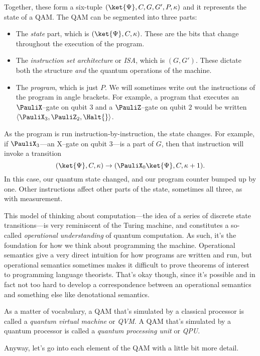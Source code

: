 Together, these form a six-tuple $(\ket{\Psi}, C, G, G', P, \kappa)$ and it represents the state of a QAM. The QAM can be segmented into three parts:
\begin{itemize}
\item The \emph{state} part, which is $(\ket{\Psi}, C, \kappa)$. These are the bits that change throughout the execution of the program.
\item The \emph{instruction set architecture} or \emph{ISA}, which is $(G, G')$. These dictate both the structure \emph{and} the quantum operations of the machine.
\item The \emph{program}, which is just $P$. We will sometimes write out the instructions of the program in angle brackets. For example, a program that executes an $\PauliX$--gate on qubit $3$ and a $\PauliZ$--gate on qubit $2$ would be written $\langle\PauliX_3,\PauliZ_2,\Halt{}\rangle$.
\end{itemize}
As the program is run instruction-by-instruction, the state changes. For example, if $\PauliX_3$---an X--gate on qubit $3$---is a part of $G$, then that instruction will invoke a transition
\begin{displaymath}
(\ket{\Psi}, C, \kappa) \to (\PauliX_0\ket{\Psi}, C, \kappa+1).
\end{displaymath}
In this case, our quantum state changed, and our program counter bumped up by one. Other instructions affect other parts of the state, sometimes all three, as with measurement.

This model of thinking about computation---the idea of a series of discrete state transitions---is very reminiscent of the Turing machine, and constitutes a so-called \emph{operational understanding} of quantum computation. As such, it's the foundation for how we think about programming the machine. Operational semantics give a very direct intuition for how programs are written and run, but operational semantics sometimes makes it difficult to prove theorems of interest to programming language theorists. That's okay though, since it's possible and in fact not too hard to develop a correspondence between an operational semantics and something else like denotational semantics.

As a matter of vocabulary, a QAM that's simulated by a classical processor is called a \emph{quantum virtual machine} or \emph{QVM}. A QAM that's simulated by a quantum processor is called a \emph{quantum processing unit} or \emph{QPU}.

Anyway, let's go into each element of the QAM with a little bit more detail.

